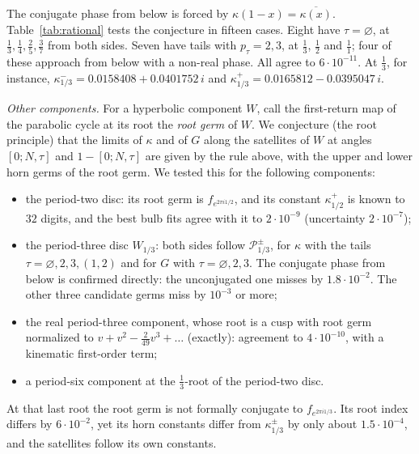 \documentclass[11pt]{amsart}
\theoremstyle{definition}
\theoremstyle{remark}
\newcommand{\fa}[1]{f_{e^{2\pi i#1}}}
\begin{document}
The conjugate phase from below is forced by $\kappa(1-x)=\overline{\kappa(x)}$. Table~\ref{tab:rational} tests the conjecture in fifteen cases. Eight have $\tau=\varnothing$, at $\frac13,\frac14,\frac25,\frac37$ from both sides. Seven have tails with $p_\tau=2,3$, at $\frac13$, $\frac12$ and $\frac11$; four of these approach from below with a non-real phase. All agree to $6\cdot10^{-11}$. At $\frac13$, for instance, $\kappa^-_{1/3}=0.0158408+0.0401752\,i$ and $\kappa^+_{1/3}=0.0165812-0.0395047\,i$.

\begin{table}[t]
\centering\scriptsize

\caption{One-sided limits of $\kappa$ at rationals: the tail rule of Conjecture~\ref{conj:rational} against the bulbs $[0;a_1,\ldots,a_\ell,N,\tau]$, extrapolated from $N=128,\ldots,2048$ (degree four against degree three: at most $1.3\cdot10^{-9}$).}\label{tab:rational}
\end{table}

\emph{Other components.} For a hyperbolic component $W$, call the first-return map of the parabolic cycle at its root the \emph{root germ} of $W$. We conjecture (the root principle) that the limits of $\kappa$ and of $G$ along the satellites of $W$ at angles $[0;N,\tau]$ and $1-[0;N,\tau]$ are given by the rule above, with the upper and lower horn germs of the root germ. We tested this for the following components:
\begin{itemize}
\item the period-two disc: its root germ is $\fa{1/2}$, and its constant $\kappa^+_{1/2}$ is known to $32$ digits, and the best bulb fits agree with it to $2\cdot10^{-9}$ (uncertainty $2\cdot10^{-7}$);
\item the period-three disc $W_{1/3}$: both sides follow $\mathcal P^\pm_{1/3}$, for $\kappa$ with the tails $\tau=\varnothing,2,3,(1,2)$ and for $G$ with $\tau=\varnothing,2,3$. The conjugate phase from below is confirmed directly: the unconjugated one misses by $1.8\cdot10^{-2}$. The other three candidate germs miss by $10^{-3}$ or more;
\item the real period-three component, whose root is a cusp with root germ normalized to $v+v^2-\frac2{49}v^3+\dots$ (exactly): agreement to $4\cdot10^{-10}$, with a kinematic first-order term;
\item a period-six component at the $\frac13$-root of the period-two disc.
\end{itemize}
At that last root the root germ is not formally conjugate to $\fa{1/3}$. Its root index differs by $6\cdot10^{-2}$, yet its horn constants differ from $\kappa^\pm_{1/3}$ by only about $1.5\cdot10^{-4}$, and the satellites follow its own constants.
\end{document}
